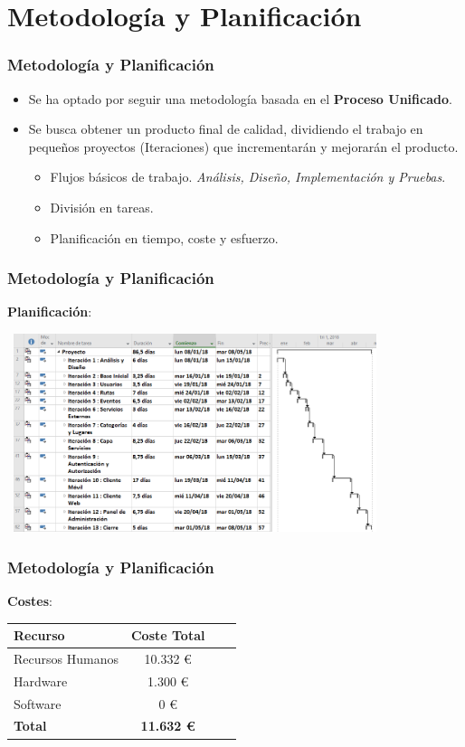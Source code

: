 \documentclass[usenames,dvipsnames]{beamer}
\begin{document}
\section{Metodología y Planificación}

\begin{frame}
\frametitle{Metodología y Planificación}
\begin{itemize}
\item Se ha optado por seguir una metodología basada en el \textbf{Proceso Unificado}.
\item Se busca obtener un producto final de calidad, dividiendo el trabajo en pequeños proyectos (Iteraciones) que incrementarán y mejorarán el producto. 
\begin{itemize}
\item Flujos básicos de trabajo. \textit{Análisis, Diseño, Implementación y Pruebas}.
\item División en tareas.
\item Planificación en tiempo, coste y esfuerzo.
\end{itemize}
\end{itemize}
\end{frame}


\begin{frame}
\frametitle{Metodología y Planificación}
\textbf{Planificación}:


\vspace{0.5cm}
\centering
\includegraphics[width=11cm, height=5.8cm]{./img/gantt.png}
\end{frame}


\begin{frame}
\frametitle{Metodología y Planificación}
\textbf{Costes}:
\begin{table}[H]
\centering
\begin{tabular}{|l|c|c|c|}
\hline
\textbf{Recurso} & \textbf{Coste Total} \\ \hline
Recursos Humanos &  10.332 € \\ \hline
Hardware & 1.300 €  \\ \hline
Software & 0 €  \\ \hline
\textbf{Total} & \textbf{11.632 €} \\ \hline
\end{tabular}
\end{table}
\end{frame}
\end{document}
